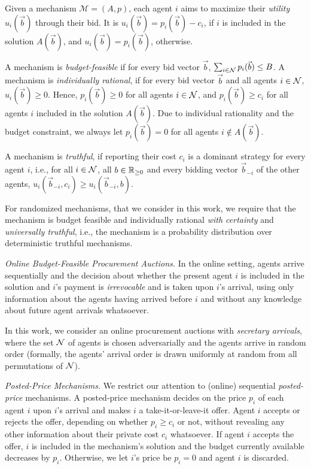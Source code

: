 Given a mechanism $\mathcal{M} = (A, p)$, each agent $i$ aims to maximize their \emph{utility} $u_i(\vec{b})$ through their bid. It is $u_i(\vec{b}) = p_i(\vec{b}) - c_i$, if $i$ is included in the solution $A(\vec{b})$, and $u_i(\vec{b}) =  p_i(\vec{b})$, otherwise. 

A mechanism is \emph{budget-feasible} if for every bid vector $\vec{b}$, $\sum_{i \in \mathcal{N}} p_i(\vec{b}) \leq B$. A mechanism is \emph{individually rational}, if for every bid vector $\vec{b}$ and all agents $i \in \mathcal{N}$, $u_i(\vec{b}) \geq 0$. Hence,  $p_i(\vec{b}) \geq 0$ for all agents $i \in \mathcal{N}$, and $p_i(\vec{b}) \geq c_i$ for all agents $i$ included in the solution $A(\vec{b})$. Due to individual rationality and the budget constraint, we always let $p_i(\vec{b}) = 0$ for all agents $i \not\in A(\vec{b})$.

A mechanism is \emph{truthful}, if reporting their cost $c_i$ is a dominant strategy for every agent $i$, i.e., for all $i\in \mathcal{N}$, all $b \in \mathbb{R}_{\geq 0}$ and every bidding vector $\vec{b}_{-i}$ of the other agents, $u_i(\vec{b}_{-i}, c_i) \geq u_i(\vec{b}_{-i}, b)$. 

For randomized mechanisms, that we consider in this work, we require that the mechanism is budget feasible and individually rational \emph{with certainty} and \emph{universally truthful}, i.e., the mechanism is a probability distribution over deterministic truthful mechanisms. 

\vskip2pt\textit{Online Budget-Feasible Procurement Auctions.}
%
In the online setting, agents arrive sequentially and the decision about whether the present agent $i$ is included in the solution and $i$'s payment is \emph{irrevocable} and is taken upon $i$'s arrival, using only information about the agents having arrived before $i$ and without any knowledge about future agent arrivals whatsoever. 

In this work, we consider an online procurement auctions with \emph{secretary arrivals}, where the set $\mathcal{N}$ of agents is chosen adversarially and the agents arrive in random order (formally, the agents' arrival order is drawn uniformly at random from all permutations of $\mathcal{N}$). 

\vskip2pt\textit{Posted-Price Mechanisms.}
%
We restrict our attention to (online) sequential \emph{posted-price} mechanisms. A posted-price mechanism decides on the price $p_i$ of each agent $i$ upon $i$'s arrival and makes $i$ a take-it-or-leave-it offer. Agent $i$ accepts or rejects the offer, depending on whether $p_i \geq c_i$ or not, without revealing any other information about their private cost $c_i$ whatsoever. If agent $i$ accepts the offer, $i$ is included in the mechanism's solution and the budget currently available decreases by $p_i$. Otherwise, we let $i$'s price be $p_i = 0$ and agent $i$ is discarded. 

